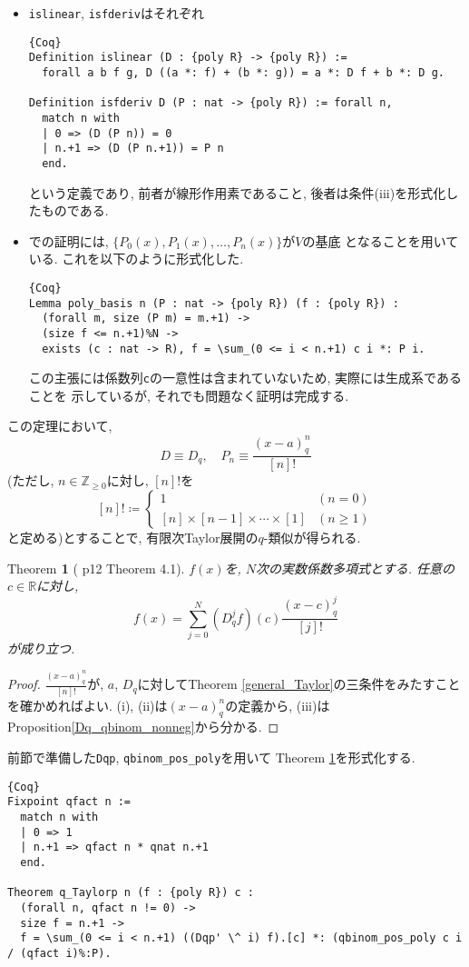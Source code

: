 \documentclass[11pt]{jsreport}
\theoremstyle{mystyle}
\newtheorem{thm}[df]{$\textrm{Theorem}$}
\newcommand{\bthm}{\begin{shadebox} \begin{thm}}
\newcommand{\ethm}{\end{thm} \end{shadebox}}
\newcommand{\bpf}{\begin{proof}}
\newcommand{\epf}{\end{proof}}
\newcommand{\Z}{\mathbb{Z}}
\newcommand{\R}{\mathbb{R}}
\newcommand{\0}{\textbf{0}}
\newcommand{\1}{\textbf{1}}
\newcommand{\2}{\textbf{2}}
\begin{document}
\begin{itemize}
  \item {\tt islinear}, {\tt isfderiv}はそれぞれ
    \begin{lstlisting}{Coq}
Definition islinear (D : {poly R} -> {poly R}) :=
  forall a b f g, D ((a *: f) + (b *: g)) = a *: D f + b *: D g.

Definition isfderiv D (P : nat -> {poly R}) := forall n,
  match n with
  | 0 => (D (P n)) = 0
  | n.+1 => (D (P n.+1)) = P n
  end. \end{lstlisting}
    という定義であり, 前者が線形作用素であること, 後者は条件(iii)を形式化したものである. 
  \item \cite{Kac}での証明には, $\{P_0(x), P_1(x), \ldots , P_n(x)\}$が$V$の基底
    となることを用いている. これを以下のように形式化した. 
    \begin{lstlisting}{Coq}
Lemma poly_basis n (P : nat -> {poly R}) (f : {poly R}) :
  (forall m, size (P m) = m.+1) ->
  (size f <= n.+1)%N ->
  exists (c : nat -> R), f = \sum_(0 <= i < n.+1) c i *: P i. \end{lstlisting}
    この主張には係数列{\tt c}の一意性は含まれていないため, 実際には生成系であることを
    示しているが, それでも問題なく証明は完成する. 
\end{itemize}
この定理において, 
\[
  D \equiv D_q, \quad P_n \equiv \frac{(x-a)^n_q}{[n]!}
\]
(ただし, $n\in\Z_{\ge0}$に対し, $[n]!$を
\[
    [n]! \coloneqq \begin{cases}
                          1 & (n=0)\\
                          [n]\times[n-1]\times\cdots\times[1] & (n\ge1)
                        \end{cases}
\]
と定める)とすることで, 有限次Taylor展開の$q$-類似が得られる. 
\bthm[\cite{Kac} p12 Theorem 4.1] \label{q_Taylor}
$f(x)$を, $N$次の実数係数多項式とする. 任意の$c\in\R$に対し, 
  \[
    f(x) = \sum_{j=0}^N (D_q^jf)(c)\frac{(x-c)^j_q}{[j]!}
  \]
が成り立つ. 
\ethm
\bpf
$\frac{(x-a)^n_q}{[n]!}$が, $a$, $D_q$に対してTheorem \ref{general_Taylor}の三条件をみたすことを確かめればよい. (i), (ii)は$(x-a)^n_q$の定義から, (iii)はProposition\ref{Dq_qbinom_nonneg}から分かる. 
\epf
前節で準備した{\tt Dqp}, {\tt qbinom\_pos\_poly}を用いて Theorem \ref{q_Taylor}を形式化する. 
\begin{lstlisting}{Coq}
Fixpoint qfact n :=
  match n with
  | 0 => 1
  | n.+1 => qfact n * qnat n.+1
  end.

Theorem q_Taylorp n (f : {poly R}) c :
  (forall n, qfact n != 0) ->
  size f = n.+1 ->
  f = \sum_(0 <= i < n.+1) ((Dqp' \^ i) f).[c] *: (qbinom_pos_poly c i / (qfact i)%:P).
\end{lstlisting}
\end{document}
